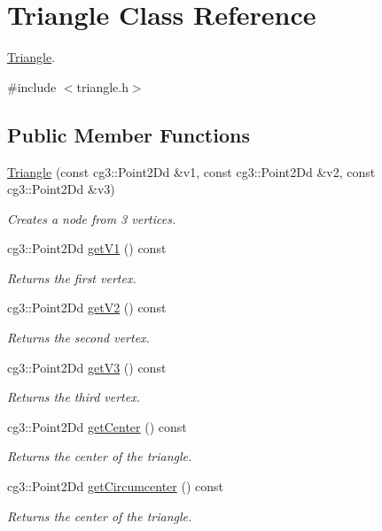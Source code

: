 \hypertarget{classTriangle}{}\section{Triangle Class Reference}
\label{classTriangle}


\hyperlink{classTriangle}{Triangle}.  




{\ttfamily \#include $<$triangle.\+h$>$}

\subsection*{Public Member Functions}
\begin{DoxyCompactItemize}
\item 
\hyperlink{classTriangle_a3bb081f3c4d90284e27e1005a2b33599}{Triangle} (const cg3\+::\+Point2\+Dd \&v1, const cg3\+::\+Point2\+Dd \&v2, const cg3\+::\+Point2\+Dd \&v3)
\begin{DoxyCompactList}\small\item\em Creates a node from 3 vertices. \end{DoxyCompactList}\item 
cg3\+::\+Point2\+Dd \hyperlink{classTriangle_a488beca5f5e516f4914f7ec118d2205e}{get\+V1} () const
\begin{DoxyCompactList}\small\item\em Returns the first vertex. \end{DoxyCompactList}\item 
cg3\+::\+Point2\+Dd \hyperlink{classTriangle_a6b22d833c2cc9b738793da637642bfd0}{get\+V2} () const
\begin{DoxyCompactList}\small\item\em Returns the second vertex. \end{DoxyCompactList}\item 
cg3\+::\+Point2\+Dd \hyperlink{classTriangle_ad63dee82c3268c96bb5a6d353675c133}{get\+V3} () const
\begin{DoxyCompactList}\small\item\em Returns the third vertex. \end{DoxyCompactList}\item 
cg3\+::\+Point2\+Dd \hyperlink{classTriangle_a4d120f7288b7051a1cf442268edd328d}{get\+Center} () const
\begin{DoxyCompactList}\small\item\em Returns the center of the triangle. \end{DoxyCompactList}\item 
cg3\+::\+Point2\+Dd \hyperlink{classTriangle_a0ac42109ff92fc5b907283e10d7946b2}{get\+Circumcenter} () const
\begin{DoxyCompactList}\small\item\em Returns the center of the triangle. \end{DoxyCompactList}\end{DoxyCompactItemize}
